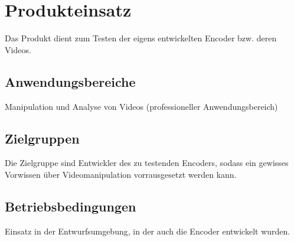 \section{Produkteinsatz}

Das Produkt dient zum Testen der eigens entwickelten Encoder bzw. deren Videos.

\subsection{Anwendungsbereiche}

Manipulation und Analyse von Videos (professioneller Anwendungsbereich)

\subsection{Zielgruppen}

Die Zielgruppe sind Entwickler des zu testenden Encoders, sodass ein gewisses Vorwissen über Videomanipulation vorrausgesetzt werden kann.

\subsection{Betriebsbedingungen}

Einsatz in der Entwurfsumgebung, in der auch die Encoder entwickelt wurden.
